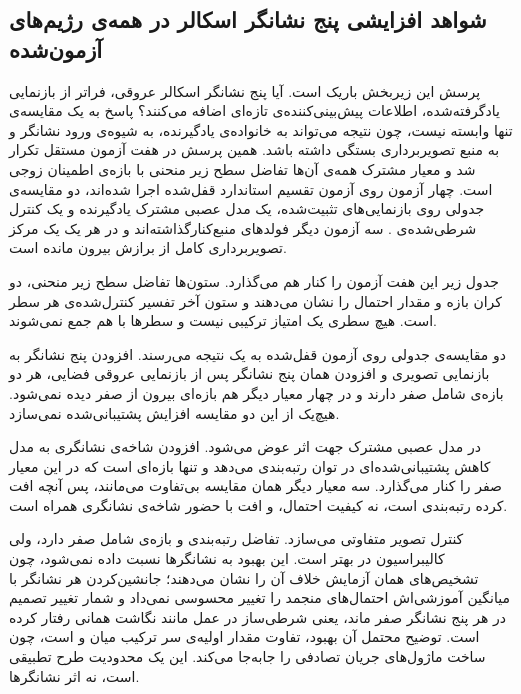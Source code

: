 \subsection{شواهد افزایشی پنج نشانگر اسکالر در همه‌ی رژیم‌های آزمون‌شده}

پرسش این زیربخش باریک است. آیا پنج نشانگر اسکالر عروقی، فراتر از بازنمایی یادگرفته‌شده، اطلاعات پیش‌بینی‌کننده‌ی تازه‌ای اضافه می‌کنند؟ پاسخ به یک مقایسه‌ی تنها وابسته نیست، چون نتیجه می‌تواند به خانواده‌ی یادگیرنده، به شیوه‌ی ورود نشانگر و به منبع تصویربرداری بستگی داشته باشد. همین پرسش در هفت آزمون مستقل تکرار شد و معیار مشترک همه‌ی آن‌ها تفاضل سطح زیر منحنی با بازه‌ی اطمینان زوجی است. چهار آزمون روی آزمون تقسیم استاندارد قفل‌شده اجرا شده‌اند، دو مقایسه‌ی جدولی روی بازنمایی‌های تثبیت‌شده، یک مدل عصبی مشترک یادگیرنده و یک کنترل شرطی‌شده‌ی . سه آزمون دیگر فولدهای منبع‌کنارگذاشته‌اند و در هر یک یک مرکز تصویربرداری کامل از برازش بیرون مانده است.

جدول زیر این هفت آزمون را کنار هم می‌گذارد. ستون‌ها تفاضل سطح زیر منحنی، دو کران بازه و مقدار احتمال را نشان می‌دهند و ستون آخر تفسیر کنترل‌شده‌ی هر سطر است. هیچ سطری یک امتیاز ترکیبی نیست و سطرها با هم جمع نمی‌شوند.



دو مقایسه‌ی جدولی روی آزمون قفل‌شده به یک نتیجه می‌رسند. افزودن پنج نشانگر به بازنمایی تصویری و افزودن همان پنج نشانگر پس از بازنمایی عروقی فضایی، هر دو بازه‌ی شامل صفر دارند و در چهار معیار دیگر هم بازه‌ای بیرون از صفر دیده نمی‌شود. هیچ‌یک از این دو مقایسه افزایش پشتیبانی‌شده نمی‌سازد.

در مدل عصبی مشترک جهت اثر عوض می‌شود. افزودن شاخه‌ی نشانگری به مدل  کاهش پشتیبانی‌شده‌ای در توان رتبه‌بندی می‌دهد و تنها بازه‌ای است که در این معیار صفر را کنار می‌گذارد. سه معیار دیگر همان مقایسه بی‌تفاوت می‌مانند، پس آنچه افت کرده رتبه‌بندی است، نه کیفیت احتمال، و افت با حضور شاخه‌ی نشانگری همراه است.

کنترل  تصویر متفاوتی می‌سازد. تفاضل رتبه‌بندی  و  بازه‌ی شامل صفر دارد، ولی کالیبراسیون در  بهتر است. این بهبود به نشانگرها نسبت داده نمی‌شود، چون تشخیص‌های همان آزمایش خلاف آن را نشان می‌دهند؛ جانشین‌کردن هر نشانگر با میانگین آموزشی‌اش احتمال‌های منجمد را تغییر محسوسی نمی‌داد و شمار تغییر تصمیم در هر پنج نشانگر صفر ماند، یعنی شرطی‌ساز در عمل مانند نگاشت همانی رفتار کرده است. توضیح محتمل آن بهبود، تفاوت مقدار اولیه‌ی سر ترکیب میان  و  است، چون ساخت ماژول‌های  جریان تصادفی را جابه‌جا می‌کند. این یک محدودیت طرح تطبیقی است، نه اثر نشانگرها.

